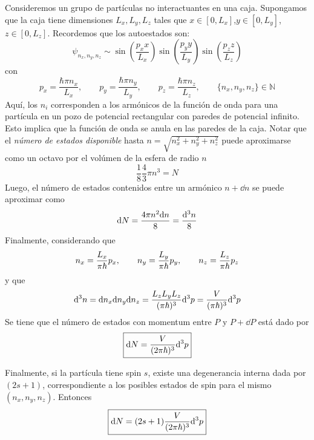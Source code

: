 Consideremos un grupo de partículas no interactuantes en una caja. Supongamos que la caja tiene dimensiones $L_x,L_y,L_z$ tales que $x\in [0,L_x]$,$y\in [0,L_y]$, $z\in [0,L_z]$. Recordemos que los autoestados son:
\begin{equation}
  \psi_{n_x,n_y,n_z}\sim \sin\left(\frac{p_xx}{L_x}\right)\sin\left(\frac{p_yy}{L_y}\right)\sin\left(\frac{p_zz}{L_z}\right)
\end{equation}
con
\begin{equation}
  p_x=\frac{\hbar \pi n_x}{L_x},\qquad p_y=\frac{\hbar \pi n_y}{L_y},\qquad p_z=\frac{\hbar \pi n_z}{L_z},\qquad \{n_x,n_y,n_z\}\in \mathbb{N}
\end{equation}
Aquí, los $n_i$ corresponden a los armónicos de la función de onda para una partícula en un pozo de potencial rectangular con paredes de potencial infinito. Esto implica que la función de onda se anula en las paredes de la caja. Notar que el \textit{número de estados disponible} hasta $n=\sqrt{n_x^2+n_y^2+n_z^2}$ puede aproximarse como un octavo por el volúmen de la esfera de radio $n$
\begin{equation}
  \frac{1}{8}\frac{4}{3}\pi n^3=N
\end{equation}
Luego, el número de estados contenidos entre un armónico $n+\dd n$ se puede aproximar como
\begin{equation}
  \dd N=\frac{4\pi n^2\dd n}{8}=\frac{\dd^3n}{8}
\end{equation}
Finalmente, considerando que
\begin{equation}
  n_x=\frac{L_x}{\pi\hbar}p_x,\qquad n_y=\frac{L_y}{\pi\hbar}p_y,\qquad n_z=\frac{L_z}{\pi\hbar}p_z
\end{equation}
y que
\begin{equation}
  \dd^3n=\dd n_x\dd n_y\dd n_z=\frac{L_zL_yL_z}{(\pi\hbar)^3}\dd^3p=\frac{V}{(\pi\hbar)^3}\dd^3p
\end{equation}
Se tiene que el número de estados con momentum entre $P$ y $P+\dd P$ está dado por
\begin{equation}
\boxed{  \dd N=\frac{V}{(2\pi\hbar)^3}\dd^3p}
\end{equation}

Finalmente, si la partícula tiene spin $s$, existe una degenerancia interna dada por $(2s+1)$, correspondiente a los posibles estados de spin para el mismo $(n_x,n_y,n_z)$. Entonces
\begin{equation}
\boxed{  \dd N=(2s+1)\frac{V}{(2\pi\hbar)^3}\dd^3p}
\end{equation}

